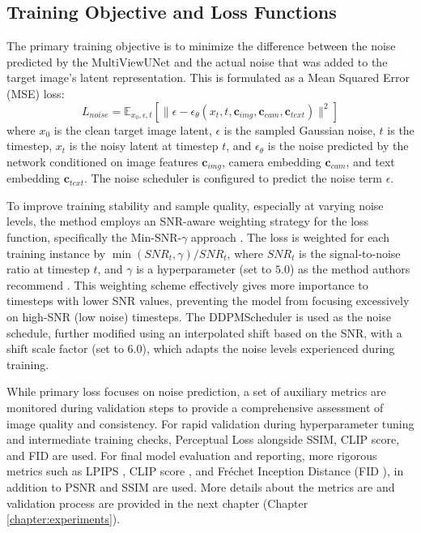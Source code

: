 \subsection{Training Objective and Loss Functions}
The primary training objective is to minimize the difference between the noise predicted by the $\text{MultiViewUNet}$ and the actual noise that was added to the target image's latent representation. This is formulated as a Mean Squared Error (MSE) loss:
\[ L_{noise} = \mathbb{E}_{x_0, \epsilon, t} [\| \epsilon - \epsilon_\theta(x_t, t, \mathbf{c}_{img}, \mathbf{c}_{cam}, \mathbf{c}_{text}) \|^2] \]
where $x_0$ is the clean target image latent, $\epsilon$ is the sampled Gaussian noise, $t$ is the timestep, $x_t$ is the noisy latent at timestep $t$, and $\epsilon_\theta$ is the noise predicted by the network conditioned on image features $\mathbf{c}_{img}$, camera embedding $\mathbf{c}_{cam}$, and text embedding $\mathbf{c}_{text}$. The noise scheduler is configured to predict the noise term $\epsilon$.

To improve training stability and sample quality, especially at varying noise levels, the method employs an SNR-aware weighting strategy for the loss function, specifically the Min-SNR-$\gamma$ approach \cite{minsnr}. The loss is weighted for each training instance by $\min(SNR_t, \gamma) / SNR_t$, where $SNR_t$ is the signal-to-noise ratio at timestep $t$, and $\gamma$ is a hyperparameter (set to $5.0$) as the method authors recommend \cite{minsnr}. This weighting scheme effectively gives more importance to timesteps with lower SNR values, preventing the model from focusing excessively on high-SNR (low noise) timesteps. The DDPMScheduler is used as the noise schedule, further modified using an interpolated shift based on the SNR, with a shift scale factor (set to $6.0$), which adapts the noise levels experienced during training.

While primary loss focuses on noise prediction, a set of auxiliary metrics are monitored during validation steps to provide a comprehensive assessment of image quality and consistency. For rapid validation during hyperparameter tuning and intermediate training checks, Perceptual Loss alongside SSIM, CLIP score, and FID are used. For final model evaluation and reporting, more rigorous metrics such as LPIPS \cite{lpips}, CLIP score \cite{clipscore}, and Fréchet Inception Distance (FID \cite{fid1, fid2}), in addition to PSNR and SSIM are used. More details about the metrics are and validation process are provided in the next chapter (Chapter \ref{chapter:experiments}).

